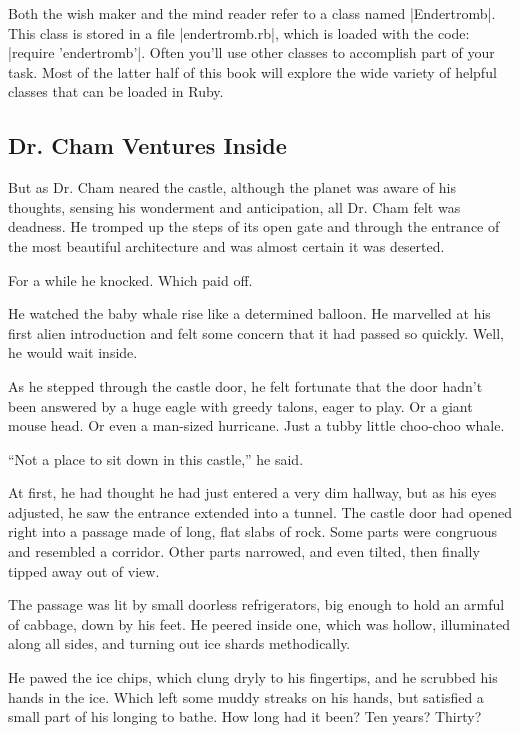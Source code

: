 \documentclass[12pt,twoside]{report}
\begin{document}
Both the wish maker and the mind reader refer to a class named
\rubyinline|Endertromb|.  This class is stored in a
file \rubyinline|endertromb.rb|, which is loaded with
the code: \rubyinline|require 'endertromb'|. Often
you'll use other classes to accomplish part of your task.  Most of the
latter half of this book will explore the wide variety of helpful
classes that can be loaded in Ruby.



\subsection{Dr. Cham Ventures Inside}



But as Dr. Cham neared the castle, although the planet was aware of
his thoughts, sensing his wonderment and anticipation, all Dr. Cham
felt was deadness.  He tromped up the steps of its open gate and
through the entrance of the most beautiful architecture and was almost
certain it was deserted.

For a while he knocked.  Which paid off.


He watched the baby whale rise like a determined balloon.  He
marvelled at his first alien introduction and felt some concern that
it had passed so quickly.  Well, he would wait inside.

As he stepped through the castle door, he felt fortunate that the door
hadn't been answered by a huge eagle with greedy talons, eager to
play.  Or a giant mouse head.  Or even a man-sized hurricane.  Just a
tubby little choo-choo whale.

``Not a place to sit down in this castle,'' he said.

At first, he had thought he had just entered a very dim hallway, but
as his eyes adjusted, he saw the entrance extended into a tunnel.  The
castle door had opened right into a passage made of long, flat slabs
of rock.  Some parts were congruous and resembled a corridor.  Other
parts narrowed, and even tilted, then finally tipped away out of view.

The passage was lit by small doorless refrigerators, big enough to
hold an armful of cabbage, down by his feet.  He peered inside one,
which was hollow, illuminated along all sides, and turning out ice
shards methodically.

He pawed the ice chips, which clung dryly to his fingertips, and he
scrubbed his hands in the ice.  Which left some muddy streaks on his
hands, but satisfied a small part of his longing to bathe. How long
had it been?  Ten years?  Thirty?
\end{document}

